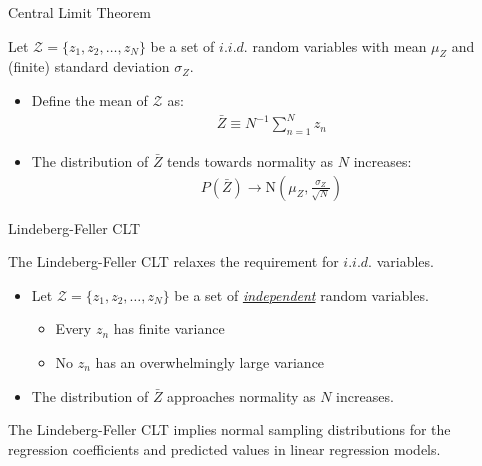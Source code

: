 \documentclass{beamer}\usepackage[]{graphicx}\usepackage[]{color}
\begin{document}

\begin{frame}{Central Limit Theorem}
  
  Let $\mathcal{Z} = \{z_1, z_2, \ldots, z_N\}$ be a set of $i.i.d.$ random
  variables with mean $\mu_Z$ and (finite) standard deviation $\sigma_Z$.\\
  \begin{itemize}
  \item Define the mean of $\mathcal{Z}$ as:
    \begin{align*}
      \bar{Z} \equiv N^{-1}\sum_{n = 1}^N z_n
    \end{align*}
  \item The distribution of $\bar{Z}$ tends towards normality as $N$ increases:
    \begin{align*}
      P(\bar{Z}) \rightarrow \text{N}\left(\mu_Z, \frac{\sigma_Z}{\sqrt{N}}\right)
    \end{align*}
  \end{itemize}
  
\end{frame}


\begin{frame}{Lindeberg-Feller CLT}
  
  The Lindeberg-Feller CLT relaxes the requirement for $i.i.d.$ variables.
  \vc
  \begin{itemize}
  \item Let $\mathcal{Z} = \{z_1, z_2, \ldots, z_N\}$ be a set of
    \emph{\underline{independent}} random variables.
    \vc
    \begin{itemize}
    \item Every $z_n$ has finite variance
      \vc
    \item No $z_n$ has an overwhelmingly large variance
    \end{itemize}
    \vc
  \item The distribution of $\bar{Z}$ approaches normality as $N$ increases.
  \end{itemize}
  \va 
  \pause
  The Lindeberg-Feller CLT implies normal sampling distributions for the
  regression coefficients and predicted values in linear regression models.
  
\end{frame}

\end{document}
